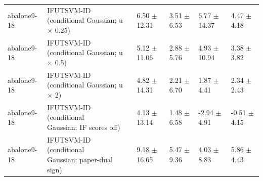 \begin{table}[!t]
{\begin{tabular}{llllll}
abalone9-18 & \shortstack[l]{IFUTSVM-ID (conditional\\Gaussian; u \(\times\) 0.25)} & 6.50 \(\pm\) 12.31 & 3.51 \(\pm\) 6.53 & 6.77 \(\pm\) 14.37 & 4.47 \(\pm\) 4.18 \\
abalone9-18 & \shortstack[l]{IFUTSVM-ID (conditional\\Gaussian; u \(\times\) 0.5)} & 5.12 \(\pm\) 11.06 & 2.88 \(\pm\) 5.76 & 4.93 \(\pm\) 10.94 & 3.38 \(\pm\) 3.82 \\
abalone9-18 & \shortstack[l]{IFUTSVM-ID (conditional\\Gaussian; u \(\times\) 2)} & 4.82 \(\pm\) 14.31 & 2.21 \(\pm\) 6.70 & 1.87 \(\pm\) 4.41 & 2.34 \(\pm\) 2.43 \\
abalone9-18 & \shortstack[l]{IFUTSVM-ID (conditional\\Gaussian; IF scores off)} & 4.13 \(\pm\) 13.14 & 1.48 \(\pm\) 6.58 & -2.94 \(\pm\) 4.91 & -0.51 \(\pm\) 4.15 \\
abalone9-18 & \shortstack[l]{IFUTSVM-ID (conditional\\Gaussian; paper-dual\\sign)} & 9.18 \(\pm\) 16.65 & 5.47 \(\pm\) 9.36 & 4.03 \(\pm\) 8.83 & 5.86 \(\pm\) 4.43 \\
\hline
\end{tabular}%
}
\end{table}

